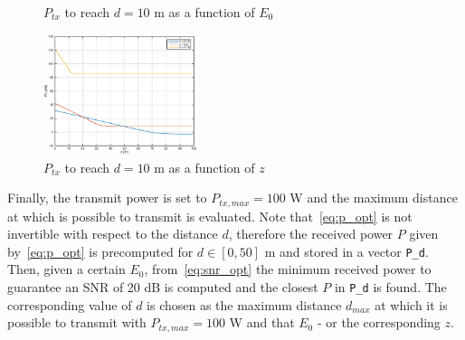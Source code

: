 \documentclass[10pt]{article}
\begin{document}
\begin{figure}[h!]
	\centering
	\caption{$P_{tx}$ to reach $d = 10$ m as a function of $E_0$}
	\label{fig:ptx}
\end{figure}

\begin{figure}[h!]
	\centering
	\includegraphics[width= 0.4\textwidth]{ptx_z}
	\caption{$P_{tx}$ to reach $d = 10$ m as a function of $z$}
	\label{fig:ptx_2}
\end{figure}

Finally, the transmit power is set to $P_{tx, max} = 100$ W and the maximum distance at which is possible to transmit is evaluated. Note that~\eqref{eq:p_opt} is not invertible with respect to the distance $d$, therefore the received power $P$ given by~\eqref{eq:p_opt} is precomputed for $d \in [0, 50]$ m and stored in a vector \texttt{P\_d}. Then, given a certain $E_0$, from~\eqref{eq:snr_opt} the minimum received power to guarantee an SNR of 20 dB is computed and the closest $P$ in \texttt{P\_d} is found. The corresponding value of $d$ is chosen as the maximum distance $d_{max}$ at which it is possible to transmit with $P_{tx, max} = 100$ W and that $E_0$ - or the corresponding $z$.
\end{document}
